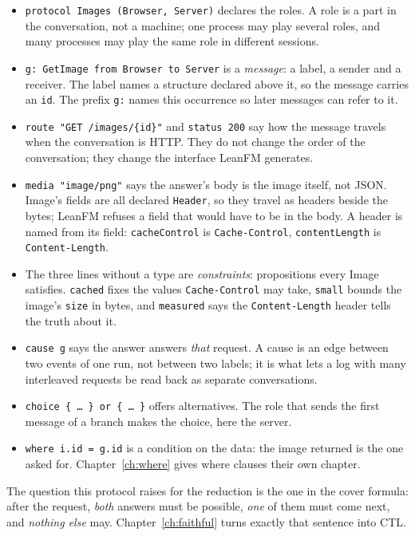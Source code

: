 \begin{itemize}
\item \texttt{protocol Images (Browser, Server)} declares the roles. A role is a
  part in the conversation, not a machine; one process may play several roles, and
  many processes may play the same role in different sessions.
\item \texttt{g: GetImage from Browser to Server} is a \emph{message}: a label, a
  sender and a receiver. The label names a structure declared above it, so the message
  carries an \texttt{id}. The prefix \texttt{g:} names this occurrence so later
  messages can refer to it.
\item \texttt{route "GET /images/\{id\}"} and \texttt{status 200} say how the message
  travels when the conversation is HTTP. They do not change the order of the
  conversation; they change the interface LeanFM generates.
\item \texttt{media "image/png"} says the answer's body is the image itself, not JSON.
  Image's fields are all declared \texttt{Header}, so they travel as headers beside the
  bytes; LeanFM refuses a field that would have to be in the body. A header is named
  from its field: \texttt{cacheControl} is \texttt{Cache-Control}, \texttt{contentLength}
  is \texttt{Content-Length}.
\item The three lines without a type are \emph{constraints}: propositions every Image
  satisfies. \texttt{cached} fixes the values \texttt{Cache-Control} may take,
  \texttt{small} bounds the image's \texttt{size} in bytes, and \texttt{measured} says the
  \texttt{Content-Length} header tells the truth about it.
\item \texttt{cause g} says the answer answers \emph{that} request. A cause is an
  edge between two events of one run, not between two labels; it is what lets a log
  with many interleaved requests be read back as separate conversations.
\item \texttt{choice \{ \ldots\ \} or \{ \ldots\ \}} offers alternatives. The role that
  sends the first message of a branch makes the choice, here the server.
\item \texttt{where i.id = g.id} is a condition on the data: the image returned is the
  one asked for. Chapter~\ref{ch:where} gives where clauses their own chapter.
\end{itemize}

The question this protocol raises for the reduction is the one in the cover formula:
after the request, \emph{both} answers must be possible, \emph{one} of them must come
next, and \emph{nothing else} may. Chapter~\ref{ch:faithful} turns exactly that sentence
into CTL.

